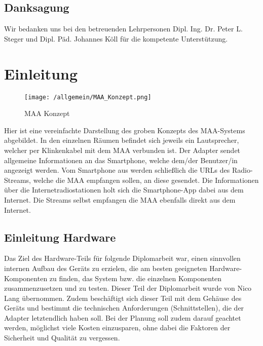 \documentclass[11pt, twoside]{article}
\begin{document}
\subsection*{Danksagung}
Wir bedanken uns bei den betreuenden Lehrpersonen Dipl. Ing. Dr. Peter L. Steger und Dipl. Päd. Johannes Köll für die kompetente Unterstützung.

\newpage
{}
\fancyfoot[LE, RO]{\raisebox{2ex}{\thepage}} %
\pagestyle{fancy} %
\setcounter{page}{1} %
\tableofcontents %

\newpage
\thispagestyle{empty}
\mbox{}
\newpage

\setcounter{page}{1} %

\section{Einleitung}
\begin{figure}[H]
	\centering
	\texttt{[image: /allgemein/MAA\_Konzept.png]}
	\caption{MAA Konzept}
\end{figure}
Hier ist eine vereinfachte Darstellung des groben Konzepts des MAA-Systems abgebildet. In den einzelnen Räumen befindet sich jeweils ein Lautsprecher, welcher per Klinkenkabel mit dem MAA verbunden ist. Der Adapter sendet allgemeine Informationen an das Smartphone, welche dem/der Benutzer/in angezeigt werden. Vom Smartphone aus werden schließlich die URLs des Radio-Streams, welche die MAA empfangen sollen, an diese gesendet. Die Informationen über die Internetradiostationen holt sich die Smartphone-App dabei aus dem Internet. Die Streams selbst empfangen die MAA ebenfalls direkt aus dem Internet. 
\subsection{Einleitung Hardware}
Das Ziel des Hardware-Teils für folgende Diplomarbeit war, einen sinnvollen internen Aufbau des Geräts zu erzielen, die am besten geeigneten Hardware-Komponenten zu finden, das System bzw. die einzelnen Komponenten zusammenzusetzen und zu testen. Dieser Teil der Diplomarbeit wurde von Nico Lang übernommen.
Zudem beschäftigt sich dieser Teil mit dem Gehäuse des Geräts und bestimmt die technischen Anforderungen (Schnittstellen), die der Adapter letztendlich haben soll. 
Bei der Planung soll zudem darauf geachtet werden, möglichst viele Kosten einzusparen, ohne dabei die Faktoren der Sicherheit und Qualität zu vergessen.
\end{document}
